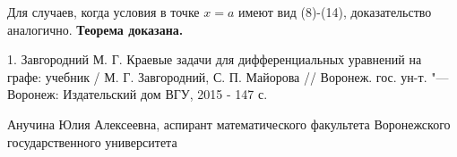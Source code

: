 {Для случаев, когда условия в точке $x=a $
имеют вид (8)-(14), доказательство аналогично.
}{\textbf{Теорема доказана.}}


\litlist


{1. Завгородний М. Г. Краевые задачи для дифференциальных
уравнений на графе: учебник / М. Г. Завгородний,
С. П. Майорова // Воронеж. гос. ун-т. "--- Воронеж:
Издательский дом ВГУ, 2015 - 147 с.}




{Анучина Юлия Алексеевна, аспирант математического
факультета Воронежского государственного
университета}

